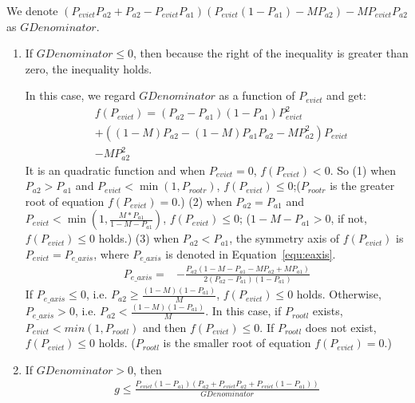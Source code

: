 We denote $(P_{evict}P_{a2}+P_{a2}-P_{evict}P_{a1})(P_{evict}(1-P_{a1})-MP_{a2})-MP_{evict}P_{a2}$ as $GDenominator$.
\begin{enumerate}
\item
If $GDenominator\leq0$,
then
because the right of the inequality is greater than zero, the inequality holds.

In this case, we regard $GDenominator$ as a function of $P_{evict}$ and get:
\begin{equation}
\begin{split}
&f(P_{evict})=(P_{a2}-P_{a1})(1-P_{a1})P_{evict}^2 \\
&+((1-M)P_{a2}-(1-M)P_{a1}P_{a2}-MP_{a2}^2)P_{evict}\\
&-MP_{a2}^2
\end{split}\end{equation}
It is an quadratic function and when $P_{evict} = 0$, $f(P_{evict})<0$.
So
(1) when $P_{a2}>P_{a1}$ and $P_{evict}< \min(1,P_{rootr})$,
    $f(P_{evict}) \leq0$;($P_{rootr}$ is the greater root of equation $f(P_{evict})=0$.)
(2) when $P_{a2}=P_{a1}$ and $P_{evict}< \min(1,\frac{M*P_{a1}}{1-M-P_{a1}})$, $f(P_{evict}) \leq0$; ($1-M-P_{a1}>0$, if not,$f(P_{evict}) \leq0$ holds.)
(3) when $P_{a2}<P_{a1}$, the symmetry axis of $f(P_{evict})$ is $P_{evict} = P_{e\_axis}$, where $P_{e\_axis}$ is denoted in Equation~\ref{equ:eaxis}.
\begin{equation}
\label{equ:eaxis}
\begin{split}
P_{e\_axis} = &-\frac{P_{a2}(1-M-P_{a1}-MP_{a2}+MP_{a1})}{2(P_{a2}-P_{a1})(1-P_{a1})}
\end{split}
\end{equation}
If $P_{e\_axis} \leq 0$, i.e. $P_{a2}\geq \frac{(1-M)(1-P_{a1})}{M}$, $f(P_{evict}) \leq0$ holds.
Otherwise, $P_{e\_axis} > 0$, i.e. $P_{a2} < \frac{(1-M)(1-P_{a1})}{M}$. In this case, if $P_{rootl}$ exists, $P_{evict}< min(1,P_{rootl})$ and then $f(P_{evict}) \leq0$. If $P_{rootl}$ does not exist, $f(P_{evict}) \leq0$ holds. ($P_{rootl}$ is the smaller root of equation $f(P_{evict})=0$.)

\item
If $GDenominator > 0$,
then
\begin{equation}
\begin{split}
g \leq \frac{P_{evict}(1-P_{a1})(P_{a2}+P_{evict}P_{a2}+P_{evict}(1-P_{a1}))}{GDenominator}
\end{split}
\end{equation}


\end{enumerate}
